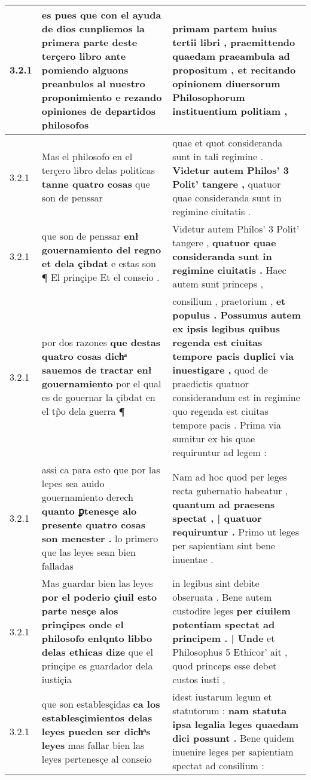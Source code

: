 \begin{tabular}{|p{1cm}|p{6.5cm}|p{6.5cm}|}
3.2.1 & es pues que con el ayuda de dios cunpliemos la primera parte deste terçero libro \textbf{ ante pomiendo alguons preanbulos al nuestro proponimiento } e rezando opiniones de departidos philosofos & primam partem huius tertii libri , \textbf{ praemittendo quaedam praeambula ad propositum , } et recitando opinionem diuersorum Philosophorum instituentium politiam , \\\hline
3.2.1 & Mas el philosofo en el terçero libro delas politicas \textbf{ tanne quatro cosas } que son de penssar & quae et quot consideranda sunt in tali regimine . \textbf{ Videtur autem Philos’ 3 Polit’ tangere , } quatuor quae consideranda sunt in regimine ciuitatis . \\\hline
3.2.1 & que son de penssar \textbf{ enł gouernamiento del regno et dela çibdat } e estas son ¶ El prinçipe Et el conseio . & Videtur autem Philos’ 3 Polit’ tangere , \textbf{ quatuor quae consideranda sunt in regimine ciuitatis . } Haec autem sunt princeps , \\\hline
3.2.1 & por dos razones \textbf{ que destas quatro cosas dichͣ sauemos de tractar enł gouernamiento } por el qual es de gouernar la çibdat en el tp̃o dela guerra ¶ & consilium , praetorium , \textbf{ et populus . Possumus autem ex ipsis legibus quibus regenda est ciuitas tempore pacis duplici via inuestigare , } quod de praedictis quatuor considerandum est in regimine quo regenda est ciuitas tempore pacis . Prima via sumitur ex his quae requiruntur ad legem : \\\hline
3.2.1 & assi ca para esto que por las lepes sea auido gouernamiento derech \textbf{ quanto ꝑtenesçe alo presente quatro cosas son menester . } lo primero que las leyes sean bien falladas & Nam ad hoc quod per leges recta gubernatio habeatur , \textbf{ quantum ad praesens spectat , | quatuor requiruntur . } Primo ut leges per sapientiam sint bene inuentae . \\\hline
3.2.1 & Mas guardar bien las leyes \textbf{ por el poderio çiuil esto parte nesçe alos prinçipes onde el philosofo enłqnto libbo delas ethicas dize } que el prinçipe es guardador dela iustiçia & in legibus sint debite obseruata . Bene autem custodire leges \textbf{ per ciuilem potentiam spectat ad principem . | Unde } et Philosophus 5 Ethicor’ ait , quod princeps esse debet custos iusti , \\\hline
3.2.1 & que son establesçidas \textbf{ ca los establesçimientos delas leyes pueden ser dichͣs leyes } mas fallar bien las leyes pertenesçe al conseio & idest iustarum legum et statutorum : \textbf{ nam statuta ipsa legalia leges quaedam dici possunt . } Bene quidem inuenire leges per sapientiam spectat ad consilium : \\\hline

\end{tabular}
